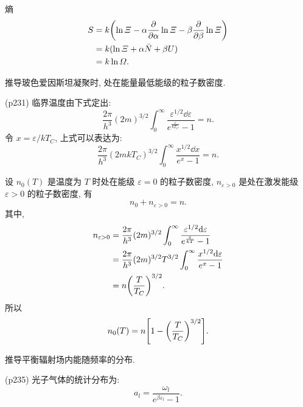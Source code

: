 \begin{questions}
\begin{solution}
    熵
    \begin{equation}
      \begin{aligned}
        S & = k \qty(\ln\varXi - \alpha\pdv{\alpha}\ln\varXi - \beta\pdv{\beta}\ln\varXi) \\
          & = k(\ln\varXi + \alpha \bar{N} + \beta U)                                     \\
          & = k \ln \varOmega.
      \end{aligned}
    \end{equation}
  \end{solution}
  \qt 推导玻色爱因斯坦凝聚时, 处在能量最低能级的粒子数密度.
  \begin{solution}
    (p231) 临界温度由下式定出:
    \begin{equation}
      \frac{2\pi}{h^3} (2m)^{3/2} \int_0^\infty\frac{\varepsilon^{1/2}\dd \varepsilon}{e^{\frac{\varepsilon}{kT_C}}-1} = n.
    \end{equation}
    令 $x = \varepsilon / kT_C$, 上式可以表达为:
    \begin{equation}
      \frac{2\pi}{h^3} (2mkT_C)^{3/2} \int_0^\infty \frac{x^{1/2}\dd x}{e^x - 1} = n.
    \end{equation}

    设 $n_0(T)$ 是温度为 $T$ 时处在能级 $\varepsilon=0$ 的粒子数密度, $n_{\varepsilon>0}$ 是处在激发能级 $\varepsilon>0$ 的粒子数密度, 有
    \begin{equation}
      n_0 + n_{\varepsilon>0} = n.
    \end{equation}
    其中,
    \begin{equation}
      \begin{aligned}
        n_{\varepsilon>0} & = \frac{2\pi}{h^3} (2m)^{3/2} \int_0^\infty \frac{\varepsilon^{1/2}\dd \varepsilon}{e^{\frac{\varepsilon}{kT}} - 1} \\
                          & = \frac{2\pi}{h^3} (2m)^{3/2} T^{3/2} \int_0^\infty \frac{x^{1/2}\dd \varepsilon}{e^{x} - 1}                        \\
                          & = n\qty(\frac{T}{T_C})^{3/2}.
      \end{aligned}
    \end{equation}
    所以
    \begin{equation}
      n_0(T) = n\qty[1-\qty(\frac{T}{T_C})^{3/2}].
    \end{equation}
  \end{solution}
  \qt 推导平衡辐射场内能随频率的分布.
  \begin{solution}
    (p235) 光子气体的统计分布为:
    \begin{equation}
      a_l = \frac{\omega_l }{e^{\beta\varepsilon_l} - 1}.
    \end{equation}


\end{solution}
\end{questions}
